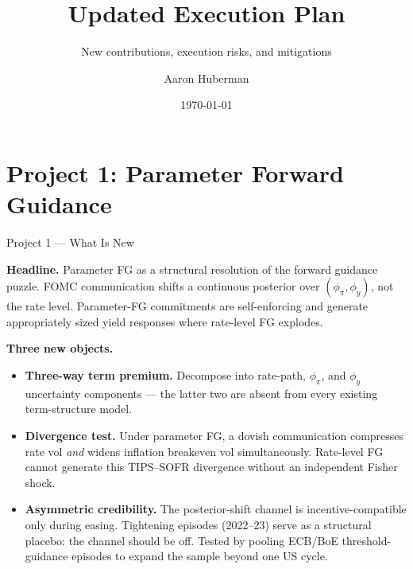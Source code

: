 \documentclass[aspectratio=169, 11pt]{beamer}
\title[Execution Plan v2]{Updated Execution Plan}
\subtitle{New contributions, execution risks, and mitigations}
\author{Aaron Huberman}
\institute{Duke University}
\date{\today}
\newcommand{\phipi}{\phi_{\pi}}
\newcommand{\phiy}{\phi_{y}}
\newenvironment{citemize}{\begin{itemize}\setlength{\itemsep}{2pt}\setlength{\parskip}{0pt}}{\end{itemize}}
\newcommand{\contribbox}[1]{%
  \begin{tcolorbox}[colback=accentgreen!10,colframe=accentgreen,boxrule=0.8pt,arc=2pt,left=4pt,right=4pt,top=2pt,bottom=2pt]
    #1\end{tcolorbox}}
\begin{document}

\begin{frame}
  \titlepage
\end{frame}

\section{Project 1: Parameter Forward Guidance}

\begin{frame}{Project 1 --- What Is New}
\small
\contribbox{\textbf{Headline.} Parameter FG as a structural resolution of the forward guidance puzzle. FOMC communication shifts a continuous posterior over $(\phipi,\phiy)$, not the rate level. Parameter-FG commitments are self-enforcing and generate appropriately sized yield responses where rate-level FG explodes.}

\vspace{0.2cm}
\textbf{Three new objects.}
\begin{citemize}
  \item \textbf{Three-way term premium.} Decompose into rate-path, $\phipi$, and $\phiy$ uncertainty components --- the latter two are absent from every existing term-structure model.
  \item \textbf{Divergence test.} Under parameter FG, a dovish communication compresses rate vol \emph{and} widens inflation breakeven vol simultaneously. Rate-level FG cannot generate this TIPS--SOFR divergence without an independent Fisher shock.
  \item \textbf{Asymmetric credibility.} The posterior-shift channel is incentive-compatible only during easing. Tightening episodes (2022--23) serve as a structural placebo: the channel should be off. Tested by pooling ECB/BoE threshold-guidance episodes to expand the sample beyond one US cycle.
\end{citemize}
\end{frame}
\end{document}
